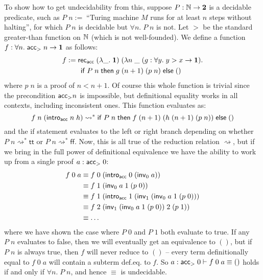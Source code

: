 To show how to get undecidability from this, suppose $P:\mathbb{N}\to\bf 2$ is a decidable predicate, such as $P\;n:=\;$``Turing machine $M$ runs for at least $n$ steps without halting'', for which $P\;n$ is decidable but $\forall n.\;P\;n$ is not. Let $>$ be the standard greater-than function on $\mathbb{N}$ (which is not well-founded). We define a function $f:\forall n.\;\mathsf{acc}_{>}\;n\to\bf 1$ as follows:
\begin{align*}
f&:=\mathsf{rec}_{\mathsf{acc}}\;(\lambda\_.\;{\bf 1})\;(\lambda n\;\_\;(g:\forall y.\;y>x\to{\bf 1}).\\
&\qquad\mathsf{if}\;P\;n\;\mathsf{then}\;g\;(n+1)\;(p\;n)\;\mathsf{else}\;()
\end{align*}
where $p\;n$ is a proof of $n<n+1$. Of course this whole function is trivial since the precondition $\mathsf{acc}_{>}n$ is impossible, but definitional equality works in all contexts, including inconsistent ones. This function evaluates as:
$$f\;n\;(\mathsf{intro}_{\mathsf{acc}}\;n\;h)\rightsquigarrow^*\mathsf{if}\;P\;n\;\mathsf{then}\;f\;(n+1)\;(h\;(n+1)\;(p\;n))\;\mathsf{else}\;()$$
and the \textsf{if} statement evaluates to the left or right branch depending on whether $P\;n\rightsquigarrow^*\mathsf{tt}$ or $P\;n\rightsquigarrow^*\mathsf{ff}$. Now, this is all true of the reduction relation $\rightsquigarrow$, but if we bring in the full power of definitional equivalence we have the ability to work up from a single proof $a:\mathsf{acc}_{>}\;0$:
\begin{align*}
f\;0\;a&\equiv f\;0\;(\mathsf{intro}_{\mathsf{acc}}\;0\;(\mathsf{inv}_0\;a))\\
&\equiv f\;1\;(\mathsf{inv}_0\;a\;1\;(p\;0))\\
&\equiv f\;1\;(\mathsf{intro}_{\mathsf{acc}}\;1\;(\mathsf{inv}_1\;(\mathsf{inv}_0\;a\;1\;(p\;0)))\\
&\equiv f\;2\;(\mathsf{inv}_1\;(\mathsf{inv}_0\;a\;1\;(p\;0))\;2\;(p\;1))\\
&\equiv\dots
\end{align*}
where we have shown the case where $P\;0$ and $P\;1$ both evaluate to true. If any $P\;n$ evaluates to false, then we will eventually get an equivalence to $()$, but if $P\;n$ is always true, then $f$ will never reduce to $()$ -- every term definitionally equal to $f\;0\;a$ will contain a subterm def.eq. to $f$. So $a:\mathsf{acc}_{>}\;0\vdash f\;0\;a\equiv()$ holds if and only if $\forall n.\;P\;n$, and hence $\equiv$ is undecidable.

